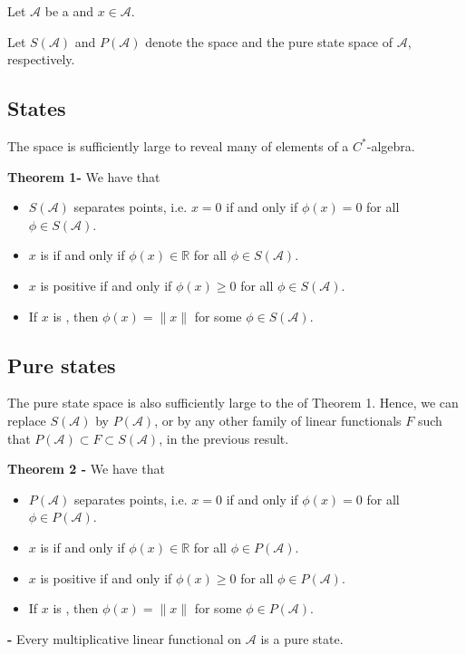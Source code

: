 \documentclass[12pt]{article}
\begin{document}
Let $\mathcal{A}$ be a  and $x \in \mathcal{A}$. 

Let $S(\mathcal{A})$ and $P(\mathcal{A})$ denote the  space and the pure state space of $\mathcal{A}$, respectively.

\subsection{States}
The  space is sufficiently large to reveal many  of elements of a $C^*$-algebra.

{\bf Theorem 1-} We have that
\begin{itemize}
\item $S(\mathcal{A})$ separates points, i.e. $x= 0$ if and only if $\phi(x) = 0$ for all $\phi \in S(\mathcal{A})$.
\item $x$ is  if and only if $\phi(x) \in \mathbb{R}$ for all $\phi \in S(\mathcal{A})$.
\item $x$ is positive if and only if $\phi(x) \geq 0$ for all $\phi \in S(\mathcal{A})$.
\item If $x$ is , then $\phi(x) = \|x\|$ for some $\phi \in S(\mathcal{A})$.
\end{itemize}

\subsection{Pure states}

The pure state space is also sufficiently large to  the  of Theorem 1. Hence, we can replace $S(\mathcal{A})$ by $P(\mathcal{A})$, or by any other family of linear functionals $F$ such that $P(\mathcal{A}) \subset F \subset S(\mathcal{A})$, in the previous result.

{\bf Theorem 2 -} We have that
\begin{itemize}
\item $P(\mathcal{A})$ separates points, i.e. $x= 0$ if and only if $\phi(x) = 0$ for all $\phi \in P(\mathcal{A})$.
\item $x$ is  if and only if $\phi(x) \in \mathbb{R}$ for all $\phi \in P(\mathcal{A})$.
\item $x$ is positive if and only if $\phi(x) \geq 0$ for all $\phi \in P(\mathcal{A})$.
\item If $x$ is , then $\phi(x) = \|x\|$ for some $\phi \in P(\mathcal{A})$.
\end{itemize}

{\bf {} -} Every multiplicative linear functional on $\mathcal{A}$ is a pure state.
\end{document}
